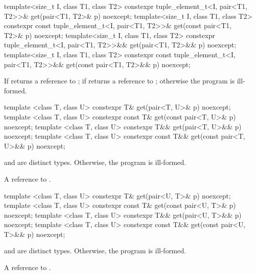 %
%
\begin{itemdecl}
template<size_t I, class T1, class T2>
  constexpr tuple_element_t<I, pair<T1, T2>>&
    get(pair<T1, T2>& p) noexcept;
template<size_t I, class T1, class T2>
  constexpr const tuple_element_t<I, pair<T1, T2>>&
    get(const pair<T1, T2>& p) noexcept;
template<size_t I, class T1, class T2>
  constexpr tuple_element_t<I, pair<T1, T2>>&&
    get(pair<T1, T2>&& p) noexcept;
template<size_t I, class T1, class T2>
  constexpr const tuple_element_t<I, pair<T1, T2>>&&
    get(const pair<T1, T2>&& p) noexcept;
\end{itemdecl}
\begin{itemdescr}

\pnum
\returns If  returns a reference to ;
if  returns a reference to ;
otherwise the program is ill-formed.
\end{itemdescr}

%
%
\begin{itemdecl}
template <class T, class U>
  constexpr T& get(pair<T, U>& p) noexcept;
template <class T, class U>
  constexpr const T& get(const pair<T, U>& p) noexcept;
template <class T, class U>
  constexpr T&& get(pair<T, U>&& p) noexcept;
template <class T, class U>
  constexpr const T&& get(const pair<T, U>&& p) noexcept;
\end{itemdecl}
\begin{itemdescr}
\pnum
\requires {} and  are distinct types. Otherwise, the program is ill-formed.

\pnum
\returns A reference to .
\end{itemdescr}

%
%
\begin{itemdecl}
template <class T, class U>
  constexpr T& get(pair<U, T>& p) noexcept;
template <class T, class U>
  constexpr const T& get(const pair<U, T>& p) noexcept;
template <class T, class U>
  constexpr T&& get(pair<U, T>&& p) noexcept;
template <class T, class U>
  constexpr const T&& get(const pair<U, T>&& p) noexcept;
\end{itemdecl}
\begin{itemdescr}

\pnum
\requires {} and  are distinct types. Otherwise, the program is ill-formed.

\pnum
\returns A reference to .
\end{itemdescr}

